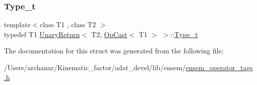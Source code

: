 \mbox{\label{structUnaryReturn_3_01T2_00_01OpCast_3_01T1_01_4_01_4_a2783d52a76cad88255fd0cdbca603ebc}} 
\subsubsection{\texorpdfstring{Type\_t}{Type\_t}\hspace{0.1cm}{\footnotesize\ttfamily [2/2]}}
{\footnotesize\ttfamily template$<$class T1 , class T2 $>$ \\
typedef T1 \mbox{\hyperlink{structUnaryReturn}{Unary\+Return}}$<$ T2, \mbox{\hyperlink{structOpCast}{Op\+Cast}}$<$ T1 $>$ $>$\+::\mbox{\hyperlink{structUnaryReturn_3_01T2_00_01OpCast_3_01T1_01_4_01_4_a2783d52a76cad88255fd0cdbca603ebc}{Type\+\_\+t}}}



The documentation for this struct was generated from the following file\+:\begin{DoxyCompactItemize}
\item 
/\+Users/archanar/\+Kinematic\+\_\+factor/adat\+\_\+devel/lib/ensem/\mbox{\hyperlink{lib_2ensem_2ensem__operator__tags_8h}{ensem\+\_\+operator\+\_\+tags.\+h}}\end{DoxyCompactItemize}
